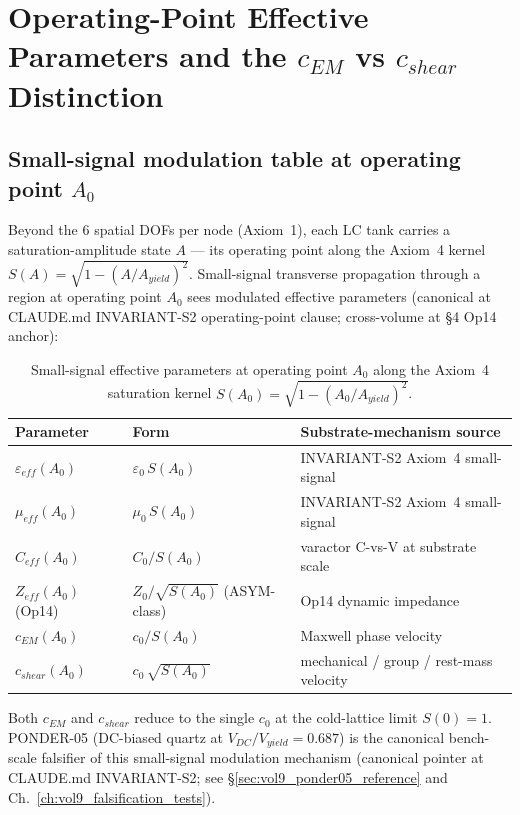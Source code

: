 \section{Operating-Point Effective Parameters and the $c_{EM}$ vs $c_{shear}$ Distinction}
\label{sec:vol9_operating_point}

\subsection{Small-signal modulation table at operating point $A_0$}

Beyond the 6 spatial DOFs per node (Axiom~1), each LC tank carries a saturation-amplitude state $A$ --- its operating point along the Axiom~4 kernel $S(A) = \sqrt{1 - (A/A_{yield})^2}$. Small-signal transverse propagation through a region at operating point $A_0$ sees modulated effective parameters (canonical at CLAUDE.md INVARIANT-S2 operating-point clause; cross-volume at  \S 4 Op14 anchor):

\begin{table}[htbp]
\centering
\begin{tabular}{l l l}
\toprule
\textbf{Parameter} & \textbf{Form} & \textbf{Substrate-mechanism source} \\
\midrule
$\varepsilon_{eff}(A_0)$ & $\varepsilon_0\, S(A_0)$ & INVARIANT-S2 Axiom~4 small-signal \\
$\mu_{eff}(A_0)$        & $\mu_0\, S(A_0)$       & INVARIANT-S2 Axiom~4 small-signal \\
$C_{eff}(A_0)$          & $C_0 / S(A_0)$         & varactor C-vs-V at substrate scale \\
$Z_{eff}(A_0)$ (Op14)   & $Z_0 / \sqrt{S(A_0)}$ (ASYM-class) & Op14 dynamic impedance \\
$c_{EM}(A_0)$           & $c_0 / S(A_0)$         & Maxwell phase velocity \\
$c_{shear}(A_0)$        & $c_0\, \sqrt{S(A_0)}$  & mechanical / group / rest-mass velocity \\
\bottomrule
\end{tabular}
\caption{Small-signal effective parameters at operating point $A_0$ along the Axiom~4 saturation kernel $S(A_0)=\sqrt{1-(A_0/A_{yield})^2}$.}
\label{tab:vol9_ac_small_signal}
\end{table}

\noindent
Both $c_{EM}$ and $c_{shear}$ reduce to the single $c_0$ at the cold-lattice limit $S(0) = 1$. PONDER-05 (DC-biased quartz at $V_{DC}/V_{yield} = 0.687$) is the canonical bench-scale falsifier of this small-signal modulation mechanism (canonical pointer at CLAUDE.md INVARIANT-S2; see \S\ref{sec:vol9_ponder05_reference} and Ch.~\ref{ch:vol9_falsification_tests}).

